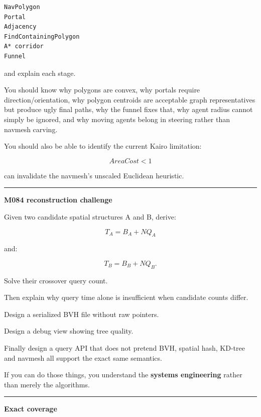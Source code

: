 \begin{verbatim}
NavPolygon
Portal
Adjacency
FindContainingPolygon
A* corridor
Funnel
\end{verbatim}

and explain each stage.

You should know why polygons are convex, why portals require direction/orientation, why polygon centroids are acceptable graph representatives but produce ugly final paths, why the funnel fixes that, why agent radius cannot simply be ignored, and why moving agents belong in steering rather than navmesh carving.

You should also be able to identify the current Kairo limitation:

\[
AreaCost<1
\]

can invalidate the navmesh's unscaled Euclidean heuristic.

\begin{center}\rule{0.5\linewidth}{0.5pt}\end{center}

\textbf{M084 reconstruction challenge}

Given two candidate spatial structures A and B, derive:

\[
T_A=B_A+NQ_A
\]

and:

\[
T_B=B_B+NQ_B.
\]

Solve their crossover query count.

Then explain why query time alone is insufficient when candidate counts differ.

Design a serialized BVH file without raw pointers.

Design a debug view showing tree quality.

Finally design a query API that does not pretend BVH, spatial hash, KD-tree and navmesh all support the exact same semantics.

If you can do those things, you understand the \textbf{systems engineering} rather than merely the algorithms.

\begin{center}\rule{0.5\linewidth}{0.5pt}\end{center}

\textbf{Exact coverage}

